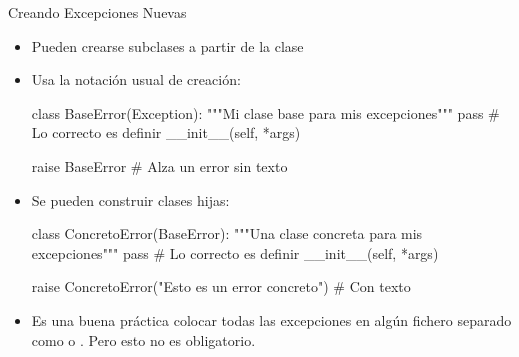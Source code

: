 \documentclass[10pt, envcountsect , spanish]{beamer}
\begin{document}
\begin{frame}[fragile]{Creando Excepciones Nuevas} 

\begin{itemize}
\item Pueden crearse subclases a partir de la clase 
\item Usa la notación usual de creación: 

{\footnotesize
\begin{pyconsole}[][frame=single, fontsize=\scriptsize]
class BaseError(Exception):
  """Mi clase base para mis excepciones"""
  pass  # Lo correcto es definir __init__(self, *args)
  
raise BaseError   # Alza un error sin texto
\end{pyconsole}
}

\item Se pueden construir clases hijas: 


{\footnotesize
\begin{pyconsole}[][frame=single, fontsize=\scriptsize]
class ConcretoError(BaseError):
  """Una clase concreta para mis excepciones"""
  pass   # Lo correcto es definir __init__(self, *args)
  
raise ConcretoError("Esto es un error concreto")  # Con texto
\end{pyconsole}
}

\item Es una buena práctica colocar todas las excepciones en algún fichero separado como  o . Pero esto no es obligatorio.

\end{itemize}
\end{frame}
\end{document}
